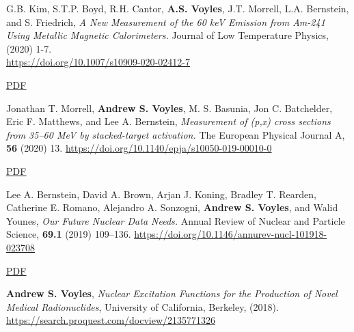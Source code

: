 \begin{bibsection}
\item G.B. Kim, S.T.P. Boyd, R.H. Cantor, \textbf{A.S. Voyles}, J.T. Morrell, L.A. Bernstein, and S. Friedrich, \emph{A New Measurement of the 60 keV Emission from Am-241 Using Metallic Magnetic Calorimeters.} Journal of Low Temperature Physics,  (2020) 1-7. \\\url{https://doi.org/10.1007/s10909-020-02412-7} 

\ifshort \vspace{0.1cm} \href{https://avoyles.github.io/papers/Kim2020_Calorimeter.pdf}{\underline{PDF}} \else  \fi 




\item Jonathan T. Morrell, \textbf{Andrew S. Voyles}, M. S. Basunia, Jon C. Batchelder, Eric F. Matthews, and Lee A. Bernstein, \emph{Measurement of (p,x) cross sections from 35--60 MeV by stacked-target activation.} The European Physical Journal A, \textbf{56} (2020) 13. \url{https://doi.org/10.1140/epja/s10050-019-00010-0} 

\ifshort \vspace{0.1cm} \href{https://avoyles.github.io/papers/Morrell2020_LaCe.pdf}{\underline{PDF}} \else  \fi 


\item Lee A. Bernstein,  David A. Brown,  Arjan J. Koning, Bradley T. Rearden,  Catherine E. Romano, Alejandro A. Sonzogni,  \textbf{Andrew S. Voyles}, and Walid Younes, \emph{Our Future Nuclear Data Needs.} Annual Review of Nuclear and Particle Science, \textbf{69.1} (2019) 109--136.
 \url{https://doi.org/10.1146/annurev-nucl-101918-023708}


\ifshort \vspace{0.1cm} \href{https://avoyles.github.io/papers/Bernstein2019_NuclearData.pdf}{\underline{PDF}} \else  \fi 



\item \textbf{Andrew S. Voyles}, \emph{Nuclear Excitation Functions for the Production of Novel Medical Radionuclides}, University of California, Berkeley, (2018). \url{https://search.proquest.com/docview/2135771326}



\end{bibsection}
